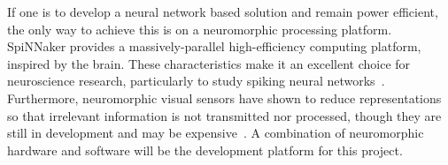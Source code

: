 If one is to develop a neural network based solution and remain power efficient, the only way to achieve this is on a neuromorphic processing platform. SpiNNaker provides a massively-parallel high-efficiency computing platform, inspired by the brain. These characteristics make it an excellent choice for neuroscience research, particularly to study spiking neural networks~\cite{furber2014spinnaker}. Furthermore, neuromorphic visual sensors have shown to reduce representations so that irrelevant information is not transmitted nor processed, though they are still in development and may be expensive~\cite{aer-retina-bernabe,dvs-zurich}. A combination of neuromorphic hardware and software will be the development platform for this project.
